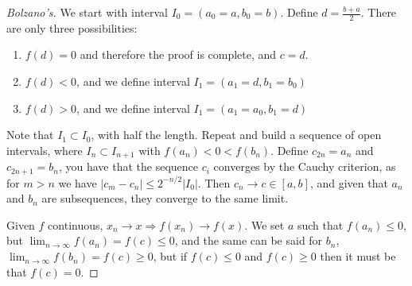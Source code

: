 \documentclass[aspectratio=169, handout]{beamer}
\begin{document}
\begin{frame}
    \begin{proof}[Bolzano's]
        We start with interval $I_0=(a_0=a,b_0=b)$. Define $d=\frac{b+a}{2}$. There are only three possibilities:
        \begin{enumerate}
            \item $f(d)=0$ and therefore the proof is complete, and $c=d$.
            \item $f(d)<0$, and we define interval $I_1 = (a_1 = d , b_1 = b_0)$
            \item $f(d)>0$, and we define interval $I_1 = (a_1 = a_0 , b_1 = d)$
        \end{enumerate}
        Note that $I_1\subset I_0$, with half the length. Repeat and build a sequence of open intervals, where $I_n\subset I_{n+1}$ with $f(a_n)<0<f(b_n)$.
        Define $c_{2n}=a_n$ and $c_{2n+1}=b_n$, you have that the sequence $c_i$ converges by the Cauchy criterion, as for $m>n$ we have $|c_m-c_n|\leq 2^{-n/2}|I_0|$.
        Then $c_n\rightarrow c\in[a,b]$, and given that $a_n$ and $b_n$ are subsequences, they converge to the same limit.

        Given $f$ continuous, $x_n\rightarrow x \Rightarrow f(x_n)\rightarrow f(x)$.
        We set $a$ such that $f(a_n)\leq 0$, but $\lim_{n\rightarrow \infty} f(a_n)=f(c)\leq 0$, and the same can be said for $b_n$, $\lim_{n\rightarrow\infty}f(b_n)=f(c)\geq 0$, but if
        $f(c)\leq0$ and $f(c)\geq 0$ then it must be that $f(c)=0$.
    \end{proof}
\end{frame}


\begin{frame}
    \begin{center}
        \begin{figure}
            \centering
        \end{figure}
    \end{center}
\end{frame}
\end{document}
